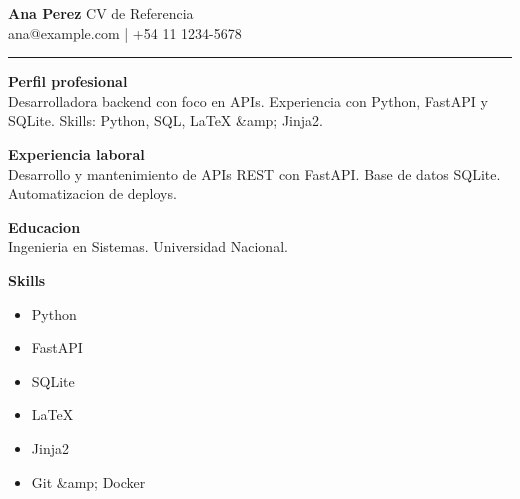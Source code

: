 \documentclass[9pt,a4paper]{article}
\begin{document}
\textbf{\Large Ana Perez} \hfill CV de Referencia\\
{\small ana@example.com | +54 11 1234-5678}

\vspace{0.6em}
\hrule
\vspace{0.6em}

\textbf{Perfil profesional}\\
{\small Desarrolladora backend con foco en APIs. Experiencia con Python, FastAPI y SQLite. Skills: Python, SQL, LaTeX \&amp; Jinja2.}

\textbf{Experiencia laboral}\\
{\small Desarrollo y mantenimiento de APIs REST con FastAPI. Base de datos SQLite. Automatizacion de deploys.}

\textbf{Educacion}\\
{\small Ingenieria en Sistemas. Universidad Nacional.}

\textbf{Skills}\\
\begin{itemize}
  \item Python
  \item FastAPI
  \item SQLite
  \item LaTeX
  \item Jinja2
  \item Git \&amp; Docker
\end{itemize}
\end{document}
